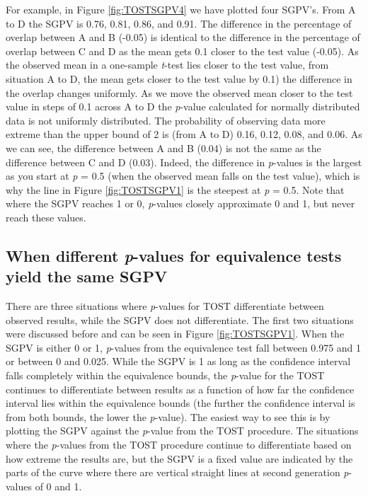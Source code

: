 \documentclass[,man,floatsintext]{apa6}
\begin{document}
For example, in Figure \ref{fig:TOSTSGPV4} we have plotted four SGPV's.
From A to D the SGPV is 0.76, 0.81, 0.86, and 0.91. The difference in
the percentage of overlap between A and B (-0.05) is identical to the
difference in the percentage of overlap between C and D as the mean gets
0.1 closer to the test value (-0.05). As the observed mean in a
one-sample \emph{t}-test lies closer to the test value, from situation A
to D, the mean gets closer to the test value by 0.1) the difference in
the overlap changes uniformly. As we move the observed mean closer to
the test value in steps of 0.1 across A to D the \emph{p}-value
calculated for normally distributed data is not uniformly distributed.
The probability of observing data more extreme than the upper bound of 2
is (from A to D) 0.16, 0.12, 0.08, and 0.06. As we can see, the
difference between A and B (0.04) is not the same as the difference
between C and D (0.03). Indeed, the difference in \emph{p}-values is the
largest as you start at \emph{p} = 0.5 (when the observed mean falls on
the test value), which is why the line in Figure \ref{fig:TOSTSGPV1} is
the steepest at \emph{p} = 0.5. Note that where the SGPV reaches 1 or 0,
\emph{p}-values closely approximate 0 and 1, but never reach these
values.

\subsection{\texorpdfstring{When different \emph{p}-values for
equivalence tests yield the same
SGPV}{When different p-values for equivalence tests yield the same SGPV}}\label{when-different-p-values-for-equivalence-tests-yield-the-same-sgpv}

There are three situations where \emph{p}-values for TOST differentiate
between observed results, while the SGPV does not differentiate. The
first two situations were discussed before and can be seen in Figure
\ref{fig:TOSTSGPV1}. When the SGPV is either 0 or 1, \emph{p}-values
from the equivalence test fall between 0.975 and 1 or between 0 and
0.025. While the SGPV is 1 as long as the confidence interval falls
completely within the equivalence bounds, the \emph{p}-value for the
TOST continues to differentiate between results as a function of how far
the confidence interval lies within the equivalence bounds (the further
the confidence interval is from both bounds, the lower the
\emph{p}-value). The easiest way to see this is by plotting the SGPV
against the \emph{p}-value from the TOST procedure. The situations where
the \emph{p}-values from the TOST procedure continue to differentiate
based on how extreme the results are, but the SGPV is a fixed value are
indicated by the parts of the curve where there are vertical straight
lines at second generation \emph{p}-values of 0 and 1.
\end{document}
